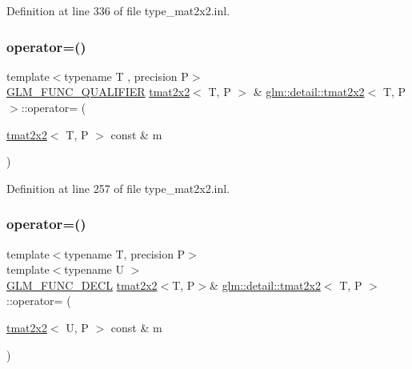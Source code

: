 Definition at line 336 of file type\+\_\+mat2x2.\+inl.

\mbox{\label{structglm_1_1detail_1_1tmat2x2_a614355976a61bf79d7e7ab0e445cd954}} 
\subsubsection{\texorpdfstring{operator=()}{operator=()}\hspace{0.1cm}{\footnotesize\ttfamily [1/3]}}
{\footnotesize\ttfamily template$<$typename T , precision P$>$ \\
\hyperlink{setup_8hpp_a33fdea6f91c5f834105f7415e2a64407}{G\+L\+M\+\_\+\+F\+U\+N\+C\+\_\+\+Q\+U\+A\+L\+I\+F\+I\+ER} \hyperlink{structglm_1_1detail_1_1tmat2x2}{tmat2x2}$<$ T, P $>$ \& \hyperlink{structglm_1_1detail_1_1tmat2x2}{glm\+::detail\+::tmat2x2}$<$ T, P $>$\+::operator= (\begin{DoxyParamCaption}\item[{\hyperlink{structglm_1_1detail_1_1tmat2x2}{tmat2x2}$<$ T, P $>$ const \&}]{m }\end{DoxyParamCaption})}



Definition at line 257 of file type\+\_\+mat2x2.\+inl.

\mbox{\label{structglm_1_1detail_1_1tmat2x2_a7057eb615bb4f04105d614256cdf5ed6}} 
\subsubsection{\texorpdfstring{operator=()}{operator=()}\hspace{0.1cm}{\footnotesize\ttfamily [2/3]}}
{\footnotesize\ttfamily template$<$typename T, precision P$>$ \\
template$<$typename U $>$ \\
\hyperlink{setup_8hpp_ab2d052de21a70539923e9bcbf6e83a51}{G\+L\+M\+\_\+\+F\+U\+N\+C\+\_\+\+D\+E\+CL} \hyperlink{structglm_1_1detail_1_1tmat2x2}{tmat2x2}$<$T, P$>$\& \hyperlink{structglm_1_1detail_1_1tmat2x2}{glm\+::detail\+::tmat2x2}$<$ T, P $>$\+::operator= (\begin{DoxyParamCaption}\item[{\hyperlink{structglm_1_1detail_1_1tmat2x2}{tmat2x2}$<$ U, P $>$ const \&}]{m }\end{DoxyParamCaption})}

